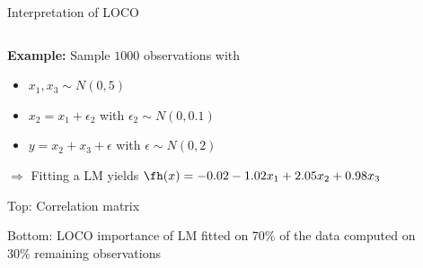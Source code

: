 \documentclass[11pt,compress,t,notes=noshow, aspectratio=169, xcolor=table]{beamer}
\begin{document}
\begin{frame}{Interpretation of LOCO}

\begin{columns}[c]
\begin{column}{0.7\textwidth}


\textbf{Example:} Sample $1000$ observations with
\begin{itemize}
    \item $x_1, x_3 \sim N(0, 5)$
    \item $x_2 = x_1 + \epsilon_2$ with $\epsilon_2 \sim N(0, 0.1)$
    \item $y = x_2 + x_3 + \epsilon$ with $\epsilon \sim N(0, 2)$
\end{itemize}

$\Rightarrow$ Fitting a LM yields
$\fh(x) = -0.02 - 1.02 x_1 + 2.05 x_2 + 0.98 x_3$


\lz\pause
Top: Correlation matrix

Bottom: LOCO importance of LM fitted on 70\% of the data computed on 30\% remaining observations

\end{column}
\begin{column}{0.3\textwidth}


\end{column}
\end{columns}
\end{frame}
\end{document}
